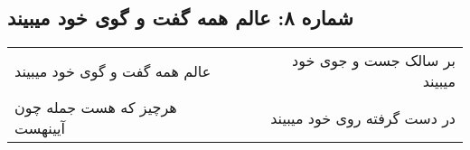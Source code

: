 \begin{center}
\section*{شماره ۸: عالم همه گفت و گوی خود میبیند}
\label{sec:008}
\begin{longtable}{l p{0.5cm} r}
عالم همه گفت و گوی خود میبیند
&&
بر سالک جست و جوی خود میبیند
\\
هرچیز که هست جمله چون آیینهست
&&
در دست گرفته روی خود میبیند
\\
\end{longtable}
\end{center}
